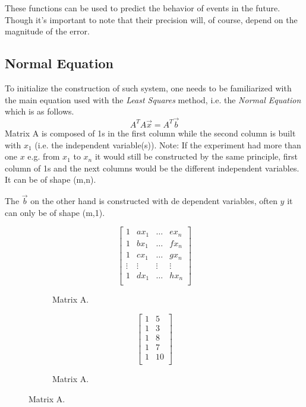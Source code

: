 \documentclass[letterpaper, conference]{IEEEtran}
\begin{document}
			These functions can be used to predict the behavior of events in the future. Though it's important to note that their precision will, of course, depend on the magnitude of the error.
			
		\subsection{Normal Equation}
			To initialize the construction of such system, one needs to be familiarized with the main equation used with the \textit{Least Squares} method, i.e. the \textit{Normal Equation} which is as follows.
			\begin{equation}
				A^T A \vec{x} = A^T \vec{b} \label{Normal Equation}
			\end{equation}
			Matrix A is composed of 1s in the first column while the second column is built  with $x_{1}$ (i.e. the independent variable(s)). Note: If the experiment had more than one $x$ e.g. from $x_{1}$ to $x_{n}$ it would still be constructed by the same principle, first column of 1s and the next columns would be the different independent variables. It can be of shape (m,n).
			
			The $\vec{b}$ on the other hand is constructed with de dependent variables, often $y$ it can only be of shape (m,1).
		\begin{figure}
			\centering
			\begin{subfigure}{.2\textwidth}
				\[
				\begin{bmatrix}
				1       & ax_{1}  & \dots & ex_{n} \\
				1       & bx_{1}  & \dots & fx_{n} \\
				1       & cx_{1}  & \dots & gx_{n} \\
				\vdots	& \vdots  & \vdots& \vdots \\
				1       & dx_{1}  & \dots & hx_{n} \\
				\end{bmatrix}
				\]
				\caption{Matrix A.}
				\label{figure1}
			\end{subfigure}
			\begin{subfigure}{.2\textwidth}
				\centering
				\[
				\begin{bmatrix}
				1       & 5  \\
				1       & 3  \\
				1       & 8  \\
				1	    & 7  \\
				1       & 10 \\
				\end{bmatrix}
				\]
				\caption{Matrix A.}
				\label{figure2}
			\end{subfigure}
		\end{figure}
\end{document}
